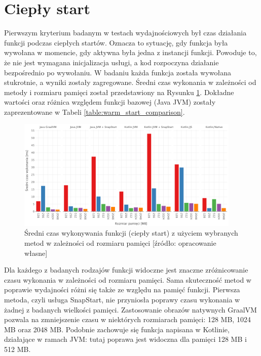 \section{Ciepły start}\label{chapter:results_warm_start}

Pierwszym kryterium badanym w testach wydajnościowych był czas działania funkcji podczas ciepłych startów.
Oznacza to sytuację, gdy funkcja była wywołana w momencie, gdy aktywna była jedna z instancji funkcji.
Powoduje to, że nie jest wymagana inicjalizacja usługi, a kod rozpoczyna działanie bezpośrednio po wywołaniu.
W badaniu każda funkcja została wywołana stukrotnie, a wyniki zostały zagregowane.
Średni czas wykonania w zależności od metody i rozmiaru pamięci został przedstawiony na Rysunku \ref{fig:avg_warm_start}.
Dokładne wartości oraz różnica względem funkcji bazowej (Java JVM) zostały zaprezentowane w Tabeli \ref{table:warm_start_comparison}.

\begin{figure}[h]
    \centering
    \includegraphics[width=0.95\textwidth]{charts/results/avg-warm-start.png}
    \caption{Średni czas wykonywania funkcji (ciepły start) z użyciem wybranych metod w zależności od rozmiaru pamięci [źródło: opracowanie własne]}
    \label{fig:avg_warm_start}
\end{figure}

Dla każdego z badanych rodzajów funkcji widoczne jest znaczne zróżnicowanie czasu wykonania w zależności od rozmiaru pamięci.
Sama skuteczność metod w poprawie wydajności różni się także ze względu na pamięć funkcji.
Pierwsza metoda, czyli usługa SnapStart, nie przyniosła poprawy czasu wykonania w żadnej z badanych wielkości pamięci.
Zastosowanie obrazów natywnych GraalVM pozwala na zmniejszenie czasu w niektórych rozmiarach pamięci: 128 MB, 1024 MB oraz 2048 MB.
Podobnie zachowuje się funkcja napisana w Kotlinie, działające w ramach JVM: tutaj poprawa jest widoczna dla pamięci 128 MB i 512 MB.

